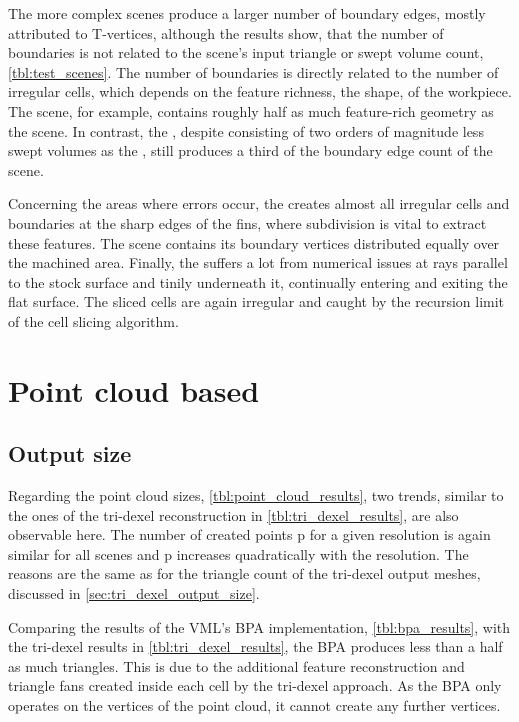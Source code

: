 The more complex scenes produce a larger number of boundary edges, mostly attributed to T-vertices, although the results show, that the number of boundaries is not related to the scene's input triangle or swept volume count, \cf \cref{tbl:test_scenes}.
The number of boundaries is directly related to the number of irregular cells, which depends on the feature richness, \ie the shape, of the workpiece.
The \impellerhalf scene, for example, contains roughly half as much feature-rich geometry as the \impeller scene.
In contrast, the \cylinderhead, despite consisting of two orders of magnitude less swept volumes as the \impeller, still produces a third of the boundary edge count of the \impeller scene.

Concerning the areas where errors occur, the \cylinderhead creates almost all irregular cells and boundaries at the sharp edges of the fins, where subdivision is vital to extract these features.
The \impeller scene contains its boundary vertices distributed equally over the machined area.
Finally, the \turbine suffers a lot from numerical issues at rays parallel to the stock surface and tinily underneath it, continually entering and exiting the flat surface.
The sliced cells are again irregular and caught by the recursion limit of the cell slicing algorithm.


\section{Point cloud based}
\label{sec:point_cloud_discussion}


\subsection {Output size}

Regarding the point cloud sizes, \cf \cref{tbl:point_cloud_results}, two trends, similar to the ones of the tri-dexel reconstruction in \cref{tbl:tri_dexel_results}, are also observable here.
The number of created points p for a given resolution is again similar for all scenes and  p increases quadratically with the resolution.
The reasons are the same as for the triangle count of the tri-dexel output meshes, discussed in \cref{sec:tri_dexel_output_size}.

Comparing the results of the VML's BPA implementation, \cf \cref{tbl:bpa_results}, with the tri-dexel results in \cref{tbl:tri_dexel_results}, the BPA produces less than a half as much triangles.
This is due to the additional feature reconstruction and triangle fans created inside each cell by the tri-dexel approach.
As the BPA only operates on the vertices of the point cloud, it cannot create any further vertices.

